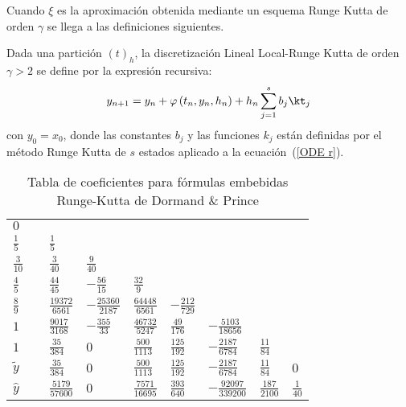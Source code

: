Cuando $\xi$ es la aproximaci\'{o}n obtenida mediante un esquema Runge Kutta de orden $\gamma$ se llega a las definiciones siguientes.
\begin{definition}
	\label{definition HLLD} \cite{Jimenez13} Dada una partici\'{o}n $(t)_{h}$, la discretizaci\'{o}n Lineal Local-Runge Kutta 
    de orden $\gamma >2$ se define por la expresi\'{o}n recursiva:
	\begin{equation*}
	y_{n+1}=y_{n}+\varphi \left( t_{n},y_{n},h_{n}\right) +h_{n}\sum_{j=1}^{s}b_{j}\kt_{j}
	\end{equation*}%
	con $y_{0}=x_{0}$, donde las constantes $b_{j}$ y las funciones $k_{j}$ est\'{a}n definidas por el m\'{e}todo Runge Kutta de $s$ estados aplicado a la ecuaci\'on~(\ref{ODE r}).
\end{definition}

\begin{table}[h] 
	\begin{center}
		\begin{tabular}{ l@{\vrule height 5pt depth 10pt width 0pt}|lllllll}
			$0$ & \\
			$\frac{1}{5}\quad$ & $\frac{1}{5}$ \\
			$\frac{3}{10}\quad$ & $\frac{3}{40}$ & $\frac{9}{40}$ \\
			$\frac{4}{5}\quad$ & $\frac{44}{45}$ & $-\frac{56}{15}$ & $\frac{32}{9}$ \\
			$\frac{8}{9}\quad$ & $\frac{19372}{6561}$ & $-\frac{25360}{2187}$ & $\frac{64448}{6561}$ & $-\frac{212}{729}$ \\
			$1\quad$ & $\frac{9017}{3168}$ & $-\frac{355}{33}$ & $\frac{46732}{5247}$ & $\frac{49}{176}$ 
			& $-\frac{5103}{18656}$ \\
			$1\quad$ & $\frac{35}{384}$ & $0$ & $\frac{500}{1113}$ & $\frac{125}{192}$ 
			& $-\frac{2187}{6784}$ & $\frac{11}{84}$ \\
			\hline
			$\widetilde{y}$ & $\frac{35}{384}$ & $0$ & $\frac{500}{1113}$ & $\frac{125}{192}$ 
			& $-\frac{2187}{6784}$ & $\frac{11}{84}$ & $0$ \rule[-0.3cm]{0cm}{0.8cm}\\
			$\widehat{y}$ & $\frac{5179}{57600}$ & $0$ & $\frac{7571}{16695}$ & $\frac{393}{640}$ 
			& $-\frac{92097}{339200}$ & $\frac{187}{2100}$ & $\frac{1}{40}$ \\
		\end{tabular}
		\caption{Tabla de coeficientes para f\'ormulas embebidas Runge-Kutta de Dormand \& Prince} \label{ButcherTabla}
	\end{center} 
\end{table}


